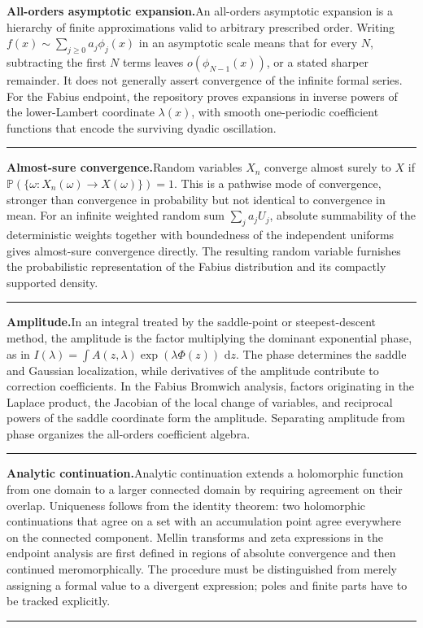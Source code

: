 \documentclass[11pt,oneside]{article}
\newcommand{\dd}{\,\mathrm d}
\newcommand{\Prob}{\mathbb P}
\newcommand{\glossaryentry}[3]{%
  \par\addvspace{0.95\baselineskip}%
  \phantomsection\hypertarget{gls:#1}{}%
  \noindent\textbf{\large #2.}\enspace #3\par
  \nopagebreak[2]\vspace{0.15\baselineskip}%
  \noindent\color{rulegray}\rule{\linewidth}{0.25pt}\color{black}%
}
\begin{document}
\glossaryentry{all-orders-asymptotic-expansion}{All-orders asymptotic expansion}{An all-orders asymptotic expansion is a hierarchy of finite approximations valid to arbitrary prescribed order. Writing \(f(x)\sim\sum_{j\ge0}a_j\phi_j(x)\) in an asymptotic scale means that for every \(N\), subtracting the first \(N\) terms leaves \(o(\phi_{N-1}(x))\), or a stated sharper remainder. It does not generally assert convergence of the infinite formal series. For the Fabius endpoint, the repository proves expansions in inverse powers of the lower-Lambert coordinate \(\lambda(x)\), with smooth one-periodic coefficient functions that encode the surviving dyadic oscillation.}
\glossaryentry{almost-sure-convergence}{Almost-sure convergence}{Random variables \(X_n\) converge almost surely to \(X\) if \(\Prob(\{\omega:X_n(\omega)\to X(\omega)\})=1\). This is a pathwise mode of convergence, stronger than convergence in probability but not identical to convergence in mean. For an infinite weighted random sum \(\sum_j a_jU_j\), absolute summability of the deterministic weights together with boundedness of the independent uniforms gives almost-sure convergence directly. The resulting random variable furnishes the probabilistic representation of the Fabius distribution and its compactly supported density.}
\glossaryentry{amplitude}{Amplitude}{In an integral treated by the saddle-point or steepest-descent method, the amplitude is the factor multiplying the dominant exponential phase, as in \(I(\lambda)=\int A(z,\lambda)\exp(\lambda\Phi(z))\,\dd z\). The phase determines the saddle and Gaussian localization, while derivatives of the amplitude contribute to correction coefficients. In the Fabius Bromwich analysis, factors originating in the Laplace product, the Jacobian of the local change of variables, and reciprocal powers of the saddle coordinate form the amplitude. Separating amplitude from phase organizes the all-orders coefficient algebra.}
\glossaryentry{analytic-continuation}{Analytic continuation}{Analytic continuation extends a holomorphic function from one domain to a larger connected domain by requiring agreement on their overlap. Uniqueness follows from the identity theorem: two holomorphic continuations that agree on a set with an accumulation point agree everywhere on the connected component. Mellin transforms and zeta expressions in the endpoint analysis are first defined in regions of absolute convergence and then continued meromorphically. The procedure must be distinguished from merely assigning a formal value to a divergent expression; poles and finite parts have to be tracked explicitly.}
\end{document}
